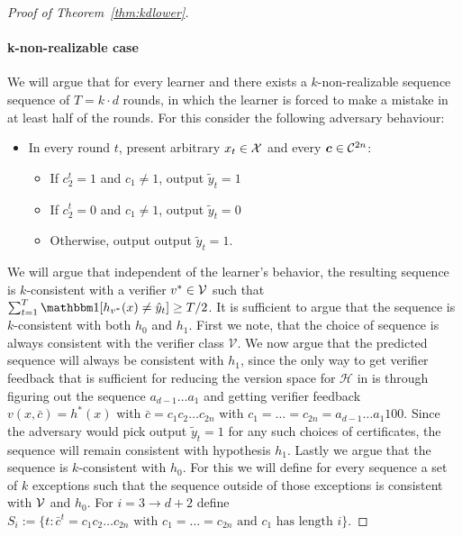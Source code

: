 \documentclass[11pt,letterpaper]{article}
\theoremstyle{definition}
\theoremstyle{plain}
\begin{document}
\begin{proof}[Proof of Theorem~\ref{thm:kdlower}]
\paragraph{k-non-realizable case} We will argue that for every learner and there exists a $k$-non-realizable sequence sequence of $T= k\cdot d$ rounds, in which the learner is forced to make a mistake in at least half of the rounds. 
For this consider the following adversary behaviour: 
\begin{itemize}
    \item In every round $t$, present arbitrary $x_t \in {\mathcal X}$ and every $\bm{c} \in {{\mathcal C}}^{2n}$: 
    \begin{itemize}
        \item If $c_2^t = 1$ and $c_1 \neq 1$, output $\tilde{y}_{t} = 1$
        \item If $c_2^t = 0$ and $c_1 \neq 1$, output $\tilde{y}_{t} = 0$
        \item Otherwise, output output $\tilde{y}_{t} = 1$.
    \end{itemize}
\end{itemize}
We will argue that independent of the learner's behavior, the resulting sequence is $k$-consistent with a verifier $v^* \in {\mathcal V}$ such that $\sum_{t=1}^T \indct[h_{v^*}(x) \neq \hat{y}_t] \geq T/2$. 
It is sufficient to argue that the sequence is $k$-consistent with both $h_0$ and $h_1$.
First we note, that the choice of sequence is always consistent with the verifier class $\mathcal{V}$.
We now argue that the predicted sequence will always be consistent with $h_1$, since the only way to get verifier feedback that is sufficient for reducing the version space for $\mathcal{H}$ in  is through figuring out the sequence $a_{d-1} \dots a_1$ and getting verifier feedback $v(x, \bar{c}) = h^* (x) $ with $\bar{c} = c_1c_2 \dots c_{2n}$ with $c_1 = \dots = c_{2n} = a_{d-1} \dots a_1 1 0 0$. Since the adversary would pick output $\tilde{y}_t =1$ for any such choices of certificates, the sequence will remain consistent with hypothesis $h_1$.
Lastly we argue that the sequence is $k$-consistent with $h_0$.
For this we will define for every sequence a set of $k$ exceptions such that the sequence outside of those exceptions is consistent with ${\mathcal V}$ and $h_0$.
For $i = 3 \to d+2$ define $S_i := \{t : \bar{c}^t = c_1c_2 \dots c_{2n} \text{ with } c_1 = \dots = c_{2n} \text{ and } c_1 \text{ has length }i\}$.


\end{proof}
\end{document}
